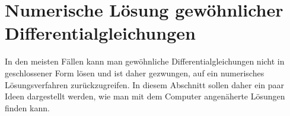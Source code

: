 %
%
%
\section{Numerische Lösung gewöhnlicher Differentialgleichungen\label{section:numerik}}
In den meisten Fällen kann man gewöhnliche Differentialgleichungen
nicht in geschlossener Form lösen und ist daher gezwungen, auf ein
numerisches Lösungsverfahren zurückzugreifen.
In diesem Abschnitt sollen daher ein paar Ideen dargestellt werden,
wie man mit dem Computer angenäherte Lösungen finden kann.




